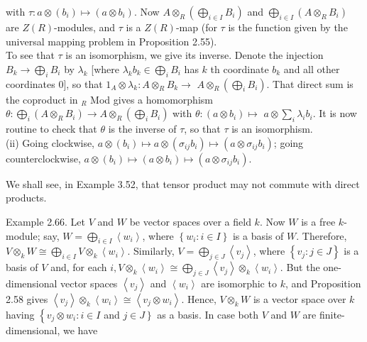 \documentclass[10pt]{article}
\begin{document}
with $\tau: a \otimes\left(b_{i}\right) \mapsto\left(a \otimes b_{i}\right)$. Now $A \otimes_{R}\left(\bigoplus_{i \in I} B_{i}\right)$ and $\bigoplus_{i \in I}\left(A \otimes_{R} B_{i}\right)$ are $Z(R)$-modules, and $\tau$ is a $Z(R)$-map (for $\tau$ is the function given by the universal mapping problem in Proposition 2.55).\\
To see that $\tau$ is an isomorphism, we give its inverse. Denote the injection $B_{k} \rightarrow \bigoplus_{i} B_{i}$ by $\lambda_{k}$ [where $\lambda_{k} b_{k} \in \bigoplus_{i} B_{i}$ has $k$ th coordinate $b_{k}$ and all other coordinates 0], so that $1_{A} \otimes \lambda_{k}: A \otimes_{R} B_{k} \rightarrow$ $A \otimes_{R}\left(\bigoplus_{i} B_{i}\right)$. That direct sum is the coproduct in ${ }_{R}$ Mod gives a homomorphism $\theta: \bigoplus_{i}\left(A \otimes_{R} B_{i}\right) \rightarrow A \otimes_{R}\left(\bigoplus_{i} B_{i}\right)$ with $\theta:\left(a \otimes b_{i}\right) \mapsto$ $a \otimes \sum_{i} \lambda_{i} b_{i}$. It is now routine to check that $\theta$ is the inverse of $\tau$, so that $\tau$ is an isomorphism.\\
(ii) Going clockwise, $a \otimes\left(b_{i}\right) \mapsto a \otimes\left(\sigma_{i j} b_{i}\right) \mapsto\left(a \otimes \sigma_{i j} b_{i}\right)$; going counterclockwise, $a \otimes\left(b_{i}\right) \mapsto\left(a \otimes b_{i}\right) \mapsto\left(a \otimes \sigma_{i j} b_{i}\right)$.

We shall see, in Example 3.52, that tensor product may not commute with direct products.

Example 2.66. Let $V$ and $W$ be vector spaces over a field $k$. Now $W$ is a free $k$-module; say, $W=\bigoplus_{i \in I}\left\langle w_{i}\right\rangle$, where $\left\{w_{i}: i \in I\right\}$ is a basis of $W$. Therefore, $V \otimes_{k} W \cong \bigoplus_{i \in I} V \otimes_{k}\left\langle w_{i}\right\rangle$. Similarly, $V=\bigoplus_{j \in J}\left\langle v_{j}\right\rangle$, where $\left\{v_{j}: j \in J\right\}$ is a basis of $V$ and, for each $i, V \otimes_{k}\left\langle w_{i}\right\rangle \cong \bigoplus_{j \in J}\left\langle v_{j}\right\rangle \otimes_{k}\left\langle w_{i}\right\rangle$. But the one-dimensional vector spaces $\left\langle v_{j}\right\rangle$ and $\left\langle w_{i}\right\rangle$ are isomorphic to $k$, and Proposition 2.58 gives $\left\langle v_{j}\right\rangle \otimes_{k}\left\langle w_{i}\right\rangle \cong\left\langle v_{j} \otimes w_{i}\right\rangle$. Hence, $V \otimes_{k} W$ is a vector space over $k$ having $\left\{v_{j} \otimes w_{i}: i \in I\right.$ and $\left.j \in J\right\}$ as a basis. In case both $V$ and $W$ are finite-dimensional, we have
\end{document}
